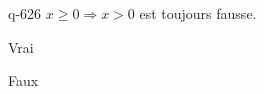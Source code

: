 \begin{truefalse}{q-626}
$x \geq 0 \Rightarrow x > 0$ est toujours fausse.
\item Vrai
\item* Faux
\end{truefalse}

